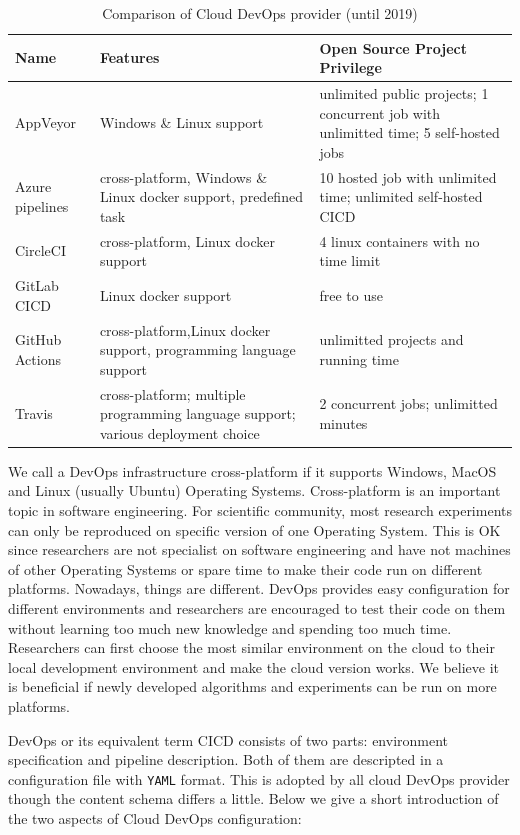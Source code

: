 \documentclass{IEEEcsmag}
\begin{document}
\begin{table}
\caption{Comparison of Cloud DevOps provider (until 2019)}
\label{table}
\small
\begin{tabular*}{17.5pc}{@{}|p{39pt}|p{73pt}<{\raggedright}|p{60pt}<{\raggedright}|@{}}
\hline
Name& 
Features& 
Open Source Project Privilege\\
\hline
AppVeyor& Windows \& Linux support & unlimited public projects; 1 concurrent job with unlimitted time; 5 self-hosted jobs
 \\
 \hline
 Azure pipelines & cross-platform, Windows \& Linux docker support, predefined task & 10 hosted job with unlimited time; unlimited self-hosted CICD
 \\
 \hline
   CircleCI& cross-platform, Linux docker support & 4 linux containers with no time limit  \\
 \hline
GitLab CICD& Linux docker support & free to use

\\
\hline
GitHub Actions& cross-platform,Linux docker support, programming language support
& unlimitted projects and running time
\\
\hline
Travis& 
cross-platform; multiple programming language support; various deployment choice
& 2 concurrent jobs; unlimitted minutes
\\
\hline
\end{tabular*}
\label{tab1}
\end{table}

We call a DevOps infrastructure cross-platform if it supports Windows, MacOS and Linux (usually Ubuntu) Operating Systems.
Cross-platform is an important topic in software engineering. For scientific community, most research experiments can only be reproduced on specific version of one Operating System. This is OK since researchers are not specialist on software engineering and have not machines of other Operating Systems or spare time to make their code run on different platforms. Nowadays, things are different. DevOps provides easy configuration for different environments and researchers are encouraged to test their code on them without learning too much new knowledge and spending too much time. Researchers can first choose the most similar environment on the cloud to their local development environment and make the cloud version works. We believe it is beneficial if newly developed algorithms and experiments can be run on more platforms. 

DevOps or its equivalent term CICD consists of two parts: environment specification and pipeline description. 
Both of them are descripted in a configuration file with \texttt{YAML} format. This is adopted by all cloud DevOps provider though the content schema differs a little. Below we give a short introduction of the two aspects of Cloud DevOps configuration:
\end{document}
